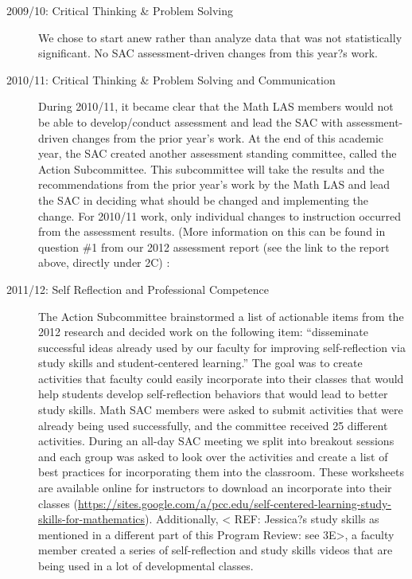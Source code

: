 \begin{description}
\item[2009/10: Critical Thinking \& Problem Solving]

We chose to start anew rather than analyze data that was not statistically significant.  No SAC assessment-driven changes from this year?s work.

\item[2010/11:  Critical Thinking \& Problem Solving and Communication]

During 2010/11, it became clear that the Math LAS members would not be able to develop/conduct assessment and lead the SAC with assessment-driven changes from the prior year's work.  At the end of this academic year, the SAC created another assessment standing committee, called the Action Subcommittee.  This subcommittee will take the results and the recommendations from the prior year's work by the Math LAS and lead the SAC in deciding what should be changed and implementing the change.  For 2010/11 work, only individual changes to instruction occurred from the assessment results.  (More information on this can be found in question \#1 from our 2012 assessment report (see the link to the report above, directly under 2C) : 

\item[2011/12: Self Reflection and Professional Competence]

The Action Subcommittee brainstormed a list of actionable items from the 2012 research and decided work on the following item: ``disseminate successful ideas already used by our faculty for improving self-reflection via study skills and student-centered learning.''  The goal was to create activities that faculty could easily incorporate into their classes that would help students develop self-reflection behaviors that would lead to better study skills.  Math SAC members were asked to submit activities that were already being used successfully, and the committee received 25 different activities.  During an all-day SAC meeting we split into breakout sessions and each group was asked to look over the activities and create a list of best practices for incorporating them into the classroom. These worksheets are available online for instructors to download an incorporate into their classes (\url{https://sites.google.com/a/pcc.edu/self-centered-learning-study-skills-for-mathematics}).  Additionally, < REF: Jessica?s study skills as mentioned in a different part of this Program Review: see 3E>, a faculty member created a series of self-reflection and study skills videos that are being used in a lot of developmental classes.


\end{description}
